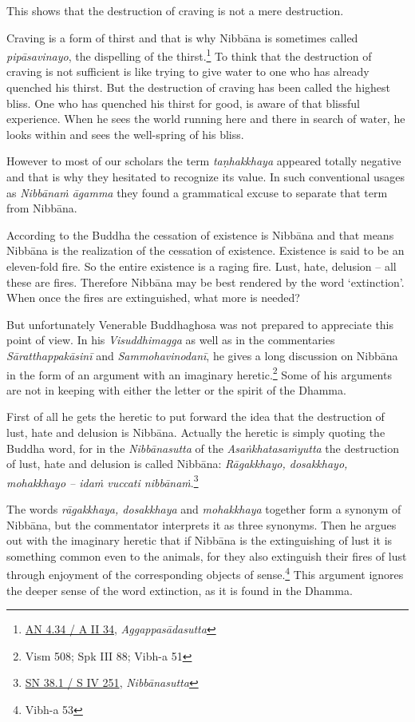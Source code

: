 This shows that the destruction of craving is not a mere destruction.

Craving is a form of thirst and that is why Nibbāna is sometimes called \emph{pipāsavinayo}, the dispelling of the thirst.\footnote{\href{https://suttacentral.net/an4.34/pli/ms}{AN 4.34 / A II 34}, \emph{Aggappasādasutta}} To think that the destruction of craving is not sufficient is like trying to give water to one who has already quenched his thirst. But the destruction of craving has been called the highest bliss. One who has quenched his thirst for good, is aware of that blissful experience. When he sees the world running here and there in search of water, he looks within and sees the well-spring of his bliss.

However to most of our scholars the term \emph{taṇhakkhaya} appeared totally negative and that is why they hesitated to recognize its value. In such conventional usages as \emph{Nibbānaṁ āgamma} they found a grammatical excuse to separate that term from Nibbāna.

According to the Buddha the cessation of existence is Nibbāna and that means Nibbāna is the realization of the cessation of existence. Existence is said to be an eleven-fold fire. So the entire existence is a raging fire. Lust, hate, delusion -- all these are fires. Therefore Nibbāna may be best rendered by the word `extinction'. When once the fires are extinguished, what more is needed?

But unfortunately Venerable Buddhaghosa was not prepared to appreciate this point of view. In his \emph{Visuddhimagga} as well as in the commentaries \emph{Sāratthappakāsinī} and \emph{Sammohavinodanī}, he gives a long discussion on Nibbāna in the form of an argument with an imaginary heretic.\footnote{Vism 508; Spk III 88; Vibh-a 51} Some of his arguments are not in keeping with either the letter or the spirit of the Dhamma.

First of all he gets the heretic to put forward the idea that the destruction of lust, hate and delusion is Nibbāna. Actually the heretic is simply quoting the Buddha word, for in the \emph{Nibbānasutta} of the \emph{Asaṅkhatasaṁyutta} the destruction of lust, hate and delusion is called Nibbāna: \emph{Rāgakkhayo, dosakkhayo, mohakkhayo -- idaṁ vuccati nibbānaṁ}.\footnote{\href{https://suttacentral.net/sn38.1/pli/ms}{SN 38.1 / S IV 251}, \emph{Nibbānasutta}}

The words \emph{rāgakkhaya, dosakkhaya} and \emph{mohakkhaya} together form a synonym of Nibbāna, but the commentator interprets it as three synonyms. Then he argues out with the imaginary heretic that if Nibbāna is the extinguishing of lust it is something common even to the animals, for they also extinguish their fires of lust through enjoyment of the corresponding objects of sense.\footnote{Vibh-a 53} This argument ignores the deeper sense of the word extinction, as it is found in the Dhamma.

